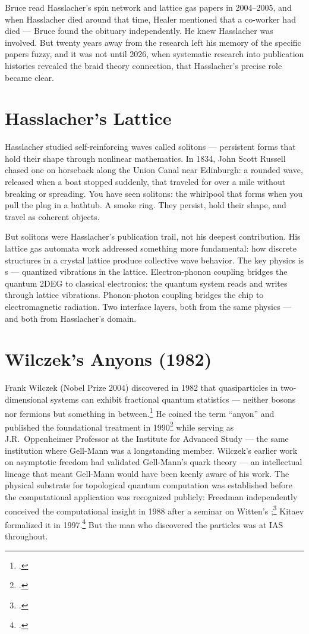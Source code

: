 Bruce read Hasslacher's spin network and lattice gas papers in 2004--2005, and when Hasslacher died around that time, Healer mentioned that a co-worker had died --- Bruce found the obituary independently. He knew Hasslacher was involved. But twenty years away from the research left his memory of the specific papers fuzzy, and it was not until 2026, when systematic research into publication histories revealed the braid theory connection, that Hasslacher's precise role became clear.

\section*{Hasslacher's Lattice}
\label{spine:braid-hasslacher-lattice}

Hasslacher studied self-reinforcing waves called \gls{soliton}s --- persistent forms that hold their shape through nonlinear mathematics. In 1834, John Scott Russell chased one on horseback along the Union Canal near Edinburgh: a rounded wave, released when a boat stopped suddenly, that traveled for over a mile without breaking or spreading. You have seen solitons: the whirlpool that forms when you pull the plug in a bathtub. A smoke ring. They persist, hold their shape, and travel as coherent objects.

But solitons were Hasslacher's publication trail, not his deepest contribution. His lattice gas automata work addressed something more fundamental: how discrete structures in a crystal lattice produce collective wave behavior. The key physics is s --- quantized vibrations in the lattice. Electron-phonon coupling bridges the quantum 2DEG to classical electronics: the quantum system reads and writes through lattice vibrations. Phonon-photon coupling bridges the chip to electromagnetic radiation. Two interface layers, both from the same physics --- and both from Hasslacher's domain.

\section*{Wilczek's Anyons (1982)}
\label{spine:braid-wilczeks-anyons-1982}

Frank Wilczek (Nobel Prize 2004) discovered in 1982 that quasiparticles in two-dimensional systems can exhibit fractional quantum statistics --- neither bosons nor fermions but something in between.\footcite{wilczek1982} He coined the term ``anyon'' and published the foundational treatment in 1990\footcite{wilczek1990} while serving as J.R.\ Oppenheimer Professor at the Institute for Advanced Study --- the same institution where Gell-Mann was a longstanding member. Wilczek's earlier work on asymptotic freedom had validated Gell-Mann's quark theory --- an intellectual lineage that meant Gell-Mann would have been keenly aware of his work. The physical substrate for topological quantum computation was established before the computational application was recognized publicly: Freedman independently conceived the computational insight in 1988 after a seminar on Witten's ;\footcite{freedman1998} Kitaev formalized it in 1997.\footcite{kitaev2003} But the man who discovered the particles was at IAS throughout.

